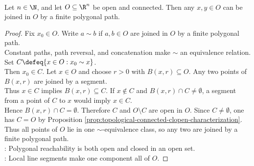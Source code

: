 \begin{proposition} \label{prop:connected-open-euclidean-path-connected} \\
Let $n\in\N$, and let $O\subseteq\R^n$ be open and connected. Then any $x,y\in O$ can be joined in $O$ by a finite polygonal path.
\begin{proof}
Fix $x_0\in O$. Write $a\sim b$ if $a,b\in O$ are joined in $O$ by a finite polygonal path.\\
Constant paths, path reversal, and concatenation make $\sim$ an equivalence relation. Set $C\defeq\{x\in O:x_0\sim x\}$.\\
Then $x_0\in C$. Let $x\in O$ and choose $r>0$ with $B(x,r)\subseteq O$. Any two points of $B(x,r)$ are joined by a segment.\\
Thus $x\in C$ implies $B(x,r)\subseteq C$. If $x\notin C$ and $B(x,r)\cap C\neq\emptyset$, a segment from a point of $C$ to $x$ would imply $x\in C$.\\
Hence $B(x,r)\cap C=\emptyset$. Therefore $C$ and $O\setminus C$ are open in $O$. Since $C\neq\emptyset$, one has $C=O$ by Proposition \ref{prop:topological-connected-clopen-characterization}.\\
Thus all points of $O$ lie in one $\sim$-equivalence class, so any two are joined by a finite polygonal path.\\
: Polygonal reachability is both open and closed in an open set.\\
: Local line segments make one component all of $O$.
\end{proof}
\end{proposition}

